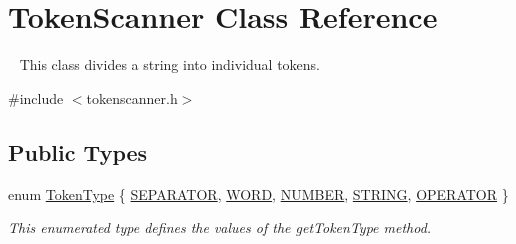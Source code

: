 \hypertarget{classTokenScanner}{}\section{Token\+Scanner Class Reference}
\label{classTokenScanner}


~\newline
 This class divides a string into individual tokens.  




{\ttfamily \#include $<$tokenscanner.\+h$>$}

\subsection*{Public Types}
\begin{DoxyCompactItemize}
\item 
enum \mbox{\hyperlink{classTokenScanner_aa520fbf142ba1e7e659590c07da31921}{Token\+Type}} \{ \mbox{\hyperlink{classTokenScanner_aa520fbf142ba1e7e659590c07da31921ac22e1a44f0ddbc929cfea45e49d20f84}{S\+E\+P\+A\+R\+A\+T\+OR}}, 
\mbox{\hyperlink{classTokenScanner_aa520fbf142ba1e7e659590c07da31921a4ad40322037d6d371dca3e5cf993f5dc}{W\+O\+RD}}, 
\mbox{\hyperlink{classTokenScanner_aa520fbf142ba1e7e659590c07da31921a12a90dfe20486bbe3e075afcd19ef2d0}{N\+U\+M\+B\+ER}}, 
\mbox{\hyperlink{classTokenScanner_aa520fbf142ba1e7e659590c07da31921aee847e634a4297b274316de8a8ca9921}{S\+T\+R\+I\+NG}}, 
\mbox{\hyperlink{classTokenScanner_aa520fbf142ba1e7e659590c07da31921a6411d9d6073252e4d316493506bbb979}{O\+P\+E\+R\+A\+T\+OR}}
 \}
\begin{DoxyCompactList}\small\item\em This enumerated type defines the values of the {\ttfamily get\+Token\+Type} method. \end{DoxyCompactList}\end{DoxyCompactItemize}

